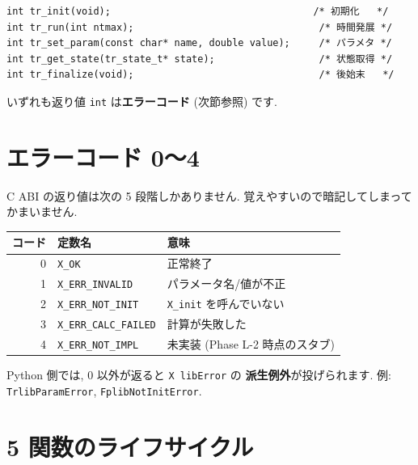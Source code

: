 \documentclass[11pt,a4paper]{report}
\begin{document}
\begin{lstlisting}[style=c,caption={C ABI 5 関数 (tr の例. 他モジュールは tr\_ を wr\_ / wrx\_ / ti\_ / fp\_ に置換)}]
int tr_init(void);                                   /* 初期化   */
int tr_run(int ntmax);                                /* 時間発展 */
int tr_set_param(const char* name, double value);     /* パラメタ */
int tr_get_state(tr_state_t* state);                  /* 状態取得 */
int tr_finalize(void);                                /* 後始末   */
\end{lstlisting}

いずれも返り値 \texttt{int} は\textbf{エラーコード} (次節参照) です.

\section{エラーコード 0〜4}

C ABI の返り値は次の 5 段階しかありません.
覚えやすいので暗記してしまってかまいません.

\begin{center}
\begin{tabular}{@{}rll@{}}
\toprule
\textbf{コード} & \textbf{定数名}            & \textbf{意味} \\ \midrule
0 & \texttt{X\_OK}              & 正常終了 \\
1 & \texttt{X\_ERR\_INVALID}    & パラメータ名/値が不正 \\
2 & \texttt{X\_ERR\_NOT\_INIT}  & \texttt{X\_init} を呼んでいない \\
3 & \texttt{X\_ERR\_CALC\_FAILED} & 計算が失敗した \\
4 & \texttt{X\_ERR\_NOT\_IMPL}  & 未実装 (Phase L-2 時点のスタブ) \\ \bottomrule
\end{tabular}
\end{center}

Python 側では, 0 以外が返ると \texttt{X lib}\texttt{Error} の
\textbf{派生例外}が投げられます. 例: \texttt{TrlibParamError},
\texttt{FplibNotInitError}.

\section{5 関数のライフサイクル}
\end{document}
